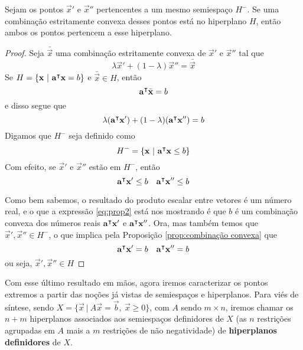 \begin{prop:hiperplano e ponto extremo}
	\label{prop:hiperplano e ponto extremo}
	Sejam os pontos $\vec{x}'$ e $\vec{x}''$ pertencentes a um mesmo
	semiespaço $H^-$. Se uma combinação estritamente convexa desses pontos
	está no hiperplano $H$, então ambos os pontos pertencem a esse hiperplano.

	\begin{proof}
		Seja $\bar{\vec{x}}$ uma combinação estritamente convexa de $\vec{x}'$ e $\vec{x}''$ tal que
		\[\lambda \vec{x}' + (1 - \lambda) \vec{x}'' = 		\bar{\vec{x}}\]
		Se $H = \{\mathbf{x}\ |\ \mathbf{a}^\intercal\mathbf{x} = b\}$ e $\bar{\vec{x}} \in H$, então
		\[\mathbf{a}^\intercal\bar{\mathbf{x}} = b\]
		e disso segue que
		\begin{equation}
			\label{eq:prop2}
			\lambda (\mathbf{a}^\intercal\mathbf{x}') + (1 - \lambda) 	(\mathbf{a}^\intercal\mathbf{x}'') = b
		\end{equation}
		Digamos que $H^-$ seja definido como
		\[H^- = \{\vec{x}\ |\ \transp{a}\vec{x} \leq b\}\]
		Com efeito, se $\vec{x}'$ e $\vec{x}''$ estão em $H^-$, então
		\[\mathbf{a}^\intercal\mathbf{x}' \leq b \quad \mathbf{a}^\intercal\mathbf{x}'' \leq b\]


		Como bem sabemos, o resultado do produto escalar entre vetores é um
		número real, e o que a expressão \ref{eq:prop2} está nos mostrando é
		que $b$ é um combinação convexa dos números reais $\mathbf{a}^\intercal\mathbf{x}'$
		e $\mathbf{a}^\intercal\mathbf{x}''$. Ora, mas também temos que
		$\vec{x}', \vec{x}'' \in H^-$, o que implica pela Proposição
		\ref*{prop:combinação convexa} que
		\[\mathbf{a}^\intercal\mathbf{x}' = b \quad \mathbf{a}^\intercal\mathbf{x}'' = b\]
		ou seja, $\vec{x}', \vec{x}'' \in H$
	\end{proof}
\end{prop:hiperplano e ponto extremo}

Com esse último resultado em mãos, agora iremos caracterizar os pontos extremos
a partir das noções já vistas de semiespaços e hiperplanos. Para viés de
síntese, sendo $X = \{\vec{x}\ |\ A\vec{x} = \vec{b},\ \vec{x} \geq 0\}$,
com $A$ sendo $m \times n$, iremos chamar os $n + m$ hiperplanos associados aos
semiespaços definidores de $X$ (as $n$ restrições agrupadas em $A$ mais
a $m$ restrições de não negatividade) de \textbf{hiperplanos definidores} de $X$.

